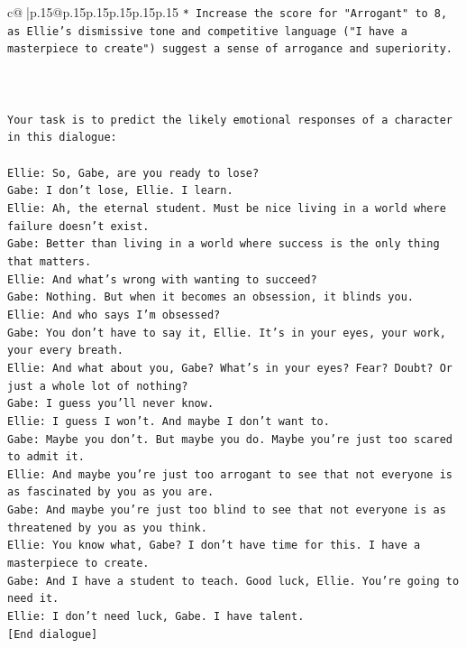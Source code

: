 \documentclass{article}
\begin{document}
{\begin{supertabular}{c@{$\;$}|p{.15\linewidth}@{}p{.15\linewidth}p{.15\linewidth}p{.15\linewidth}p{.15\linewidth}p{.15\linewidth}}
{{{\texttt{* Increase the score for "Arrogant" to 8, as Ellie's dismissive tone and competitive language ("I have a masterpiece to create") suggest a sense of arrogance and superiority.} \\
\\ 
\\ 
\\ 
\texttt{Your task is to predict the likely emotional responses of a character in this dialogue:} \\
\\ 
\texttt{Ellie: So, Gabe, are you ready to lose?} \\
\texttt{Gabe: I don't lose, Ellie. I learn.} \\
\texttt{Ellie: Ah, the eternal student. Must be nice living in a world where failure doesn't exist.} \\
\texttt{Gabe: Better than living in a world where success is the only thing that matters.} \\
\texttt{Ellie: And what's wrong with wanting to succeed? } \\
\texttt{Gabe: Nothing. But when it becomes an obsession, it blinds you.} \\
\texttt{Ellie: And who says I'm obsessed?} \\
\texttt{Gabe: You don't have to say it, Ellie. It's in your eyes, your work, your every breath.} \\
\texttt{Ellie: And what about you, Gabe? What's in your eyes? Fear? Doubt? Or just a whole lot of nothing?} \\
\texttt{Gabe: I guess you'll never know.} \\
\texttt{Ellie: I guess I won't. And maybe I don't want to.} \\
\texttt{Gabe: Maybe you don't. But maybe you do. Maybe you're just too scared to admit it.} \\
\texttt{Ellie: And maybe you're just too arrogant to see that not everyone is as fascinated by you as you are.} \\
\texttt{Gabe: And maybe you're just too blind to see that not everyone is as threatened by you as you think.} \\
\texttt{Ellie: You know what, Gabe? I don't have time for this. I have a masterpiece to create.} \\
\texttt{Gabe: And I have a student to teach. Good luck, Ellie. You're going to need it.} \\
\texttt{Ellie: I don't need luck, Gabe. I have talent.} \\
\texttt{{[}End dialogue{]}} \\
}}}
\end{supertabular}}
\end{document}

